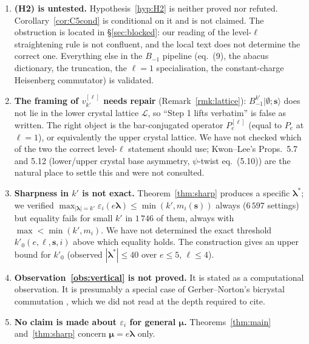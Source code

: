 \documentclass[11pt]{article}
\theoremstyle{definition}
\newcommand{\Lcr}{\mathcal{L}}
\newcommand{\eps}{\varepsilon}
\newcommand{\bs}{\mathbf{s}}
\newcommand{\blam}{\boldsymbol{\lambda}}
\newcommand{\bmu}{\boldsymbol{\mu}}
\newcommand{\bemp}{\boldsymbol{\emptyset}}
\newcommand{\Bmi}{B_{-1}}
\begin{document}
\begin{enumerate}
\item \textbf{(H2) is untested.} Hypothesis~\ref{hyp:H2} is neither proved
nor refuted. Corollary~\ref{cor:C5cond} is conditional on it and is not
claimed. The obstruction is located in \S\ref{sec:blocked}: our reading of
the level-$\ell$ straightening rule is not confluent, and the local text
does not determine the correct one. Everything else in the $\Bmi$ pipeline
(eq.~(9), the abacus dictionary, the truncation, the $\ell = 1$
specialisation, the constant-charge Heisenberg commutator) is validated.
\item \textbf{The framing of $v^{[\ell]}_{k'}$ needs repair}
(Remark~\ref{rmk:lattice}): $\Bmi^{k'}|\bemp;\bs\rangle$ does not lie in
the lower crystal lattice $\Lcr$, so ``Step 1 lifts verbatim'' is false as
written. The right object is the bar-conjugated operator $P^{[\ell]}_e$
(equal to $P_e$ at $\ell=1$), or equivalently the upper crystal lattice.
We have not checked which of the two the correct level-$\ell$ statement
should use; Kwon--Lee's Props.~5.7 and 5.12 (lower/upper crystal base
asymmetry, $\psi$-twist eq.~(5.10)) are the natural place to settle this
and were not consulted.
\item \textbf{Sharpness in $k'$ is not exact.} Theorem~\ref{thm:sharp}
produces a specific $\blam^\ast$; we verified
$\max_{|\blam| = k'}\eps_i(e\blam) \le \min(k', m_i(\bs))$ always
($6\,597$ settings) but equality fails for small $k'$ in $1\,746$ of them,
always with $\max < \min(k', m_i)$. We have not determined the exact
threshold $k'_0(e,\ell,\bs,i)$ above which equality holds. The
construction gives an upper bound for $k'_0$ (observed
$|\blam^\ast| \le 40$ over $e \le 5$, $\ell \le 4$).
\item \textbf{Observation~\ref{obs:vertical} is not proved.} It is stated
as a computational observation. It is presumably a special case of
Gerber--Norton's bicrystal commutation \cite{GN2017}, which we did not
read at the depth required to cite.
\item \textbf{No claim is made about $\eps_i$ for general $\bmu$.}
Theorems~\ref{thm:main} and~\ref{thm:sharp} concern $\bmu = e\blam$ only.
\end{enumerate}
\end{document}
